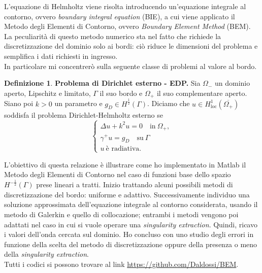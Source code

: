 \documentclass[a4paper]{article}
\theoremstyle{definition}
\newtheorem{definizione}{Definizione}
\theoremstyle{plain}
\theoremstyle{remark}
\begin{document}
{	L'equazione di Helmholtz viene risolta introducendo un'equazione integrale al contorno, ovvero \textit{boundary integral equation} (BIE), a cui viene applicato il Metodo degli Elementi di Contorno, ovvero \textit{Boundary Element Method} (BEM). La peculiarità di questo metodo numerico sta nel fatto che richiede la discretizzazione del dominio solo ai bordi: ciò riduce le dimensioni del problema e semplifica i dati richiesti in ingresso. \\
	In particolare mi concentrerò sulla seguente classe di problemi al valore al bordo.
	\begin{definizione}
		\textbf{Problema di Dirichlet esterno - EDP.} Sia $\Omega_{-}$ un dominio aperto, Lipschitz e limitato, $\Gamma$ il suo bordo e $\Omega_+$ il suo complementare aperto. Siano poi $k>0$ un parametro e $g_D \in H^{\frac{1}{2}}(\Gamma)$. Diciamo che $u \in H^1_{\text{loc}}(\overline{\Omega_{+}})$ soddisfa il problema Dirichlet-Helmholtz esterno se
		\begin{equation}
			\begin{cases}
				\Delta u + k^2 u = 0 \quad \text{in} \ \Omega_+,\\
				\gamma^+ u = g_D \quad \text{su} \ \Gamma\\
				u \ \text{è radiativa}.
			\end{cases}
		\end{equation}
	\end{definizione}
	L'obiettivo di questa relazione è illustrare come ho implementato in Matlab il Metodo degli Elementi di Contorno nel caso di funzioni base dello spazio $H^{-\frac{1}{2}}(\Gamma)$ prese lineari a tratti. Inizio trattando alcuni possibili metodi di discretizzazione del bordo: uniforme e adattivo. Successivamente individuo una soluzione approssimata dell'equazione integrale al contorno considerata, usando il metodo di Galerkin e quello di collocazione; entrambi i metodi vengono poi adattati nel caso in cui si vuole operare una \textit{singularity extraction}. Quindi, ricavo i valori dell'onda cercata sul dominio. Ho concluso con uno studio degli errori in funzione della scelta del metodo di discretizzazione oppure della presenza o meno della \textit{singularity extraction}.\\
	Tutti i codici si possono trovare al link \href{https://github.com/Daldossi/BEM}{https://github.com/Daldossi/BEM}.
	}

	\tableofcontents
	
%	
	
\end{document}
